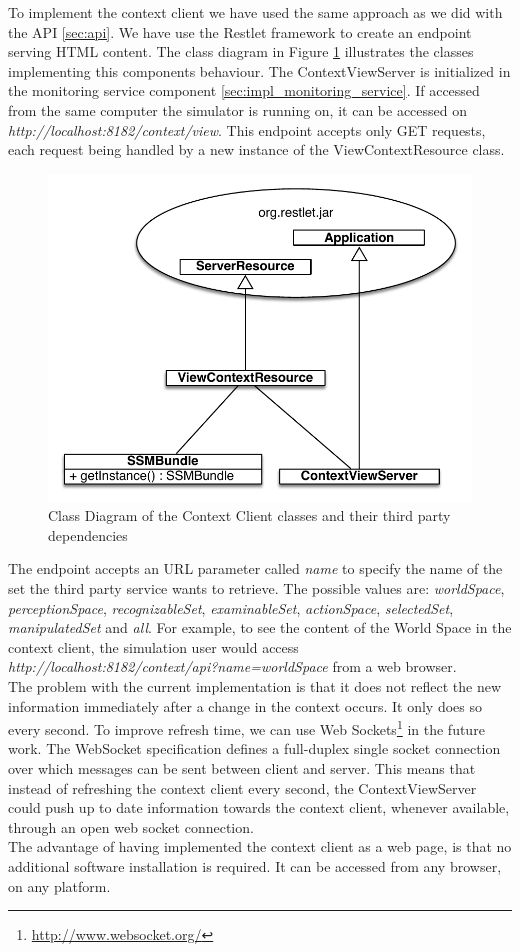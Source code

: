 To implement the context client we have used the same approach as we did with the API \ref{sec:api}. We have use the Restlet framework to create an endpoint serving HTML content. The class diagram in Figure \ref{fig:impl_context_client_class} illustrates the classes implementing this components behaviour. The ContextViewServer is initialized in the monitoring service component \ref{sec:impl_monitoring_service}. If accessed from the same computer the simulator is running on, it can be accessed on \emph{http://localhost:8182/context/view}. This endpoint accepts only GET requests, each request being handled by a new instance of the ViewContextResource class.
\begin{figure}[H]
	\centering
	\includegraphics[width=\linewidth]{gfx/Chapter4/context_client_class}
	\caption{Class Diagram of the Context Client classes and their third party dependencies}
	\label{fig:impl_context_client_class}
\end{figure}

The endpoint accepts an URL parameter called \emph{name} to specify the name of the set the third party service wants to retrieve. The possible values are: \emph{worldSpace}, \emph{perceptionSpace}, \emph{recognizableSet}, \emph{examinableSet}, \emph{actionSpace}, \emph{selectedSet}, \emph{manipulatedSet} and \emph{all}. For example, to see the content of the World Space in the context client, the simulation user would access \emph{http://localhost:8182/context/api?name=worldSpace} from a web browser.\\

The problem with the current implementation is that it does not reflect the new information immediately after a change in the context occurs. It only does so every second. To improve refresh time, we can use Web Sockets\footnote{\url{http://www.websocket.org/}} in the future work. The WebSocket specification defines a full-duplex single socket connection over which messages can be sent between client and server. This means that instead of refreshing the context client every second, the ContextViewServer could push up to date information towards the context client, whenever available, through an open web socket connection.\\

The advantage of having implemented the context client as a web page, is that no additional software installation is required. It can be accessed from any browser, on any platform.
